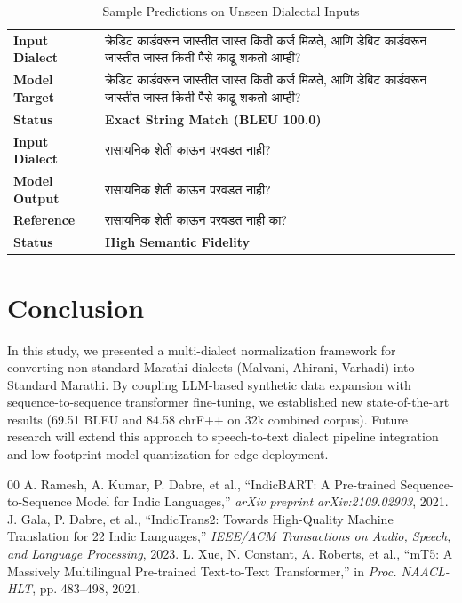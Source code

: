 \documentclass[journal,twocolumn]{IEEEtran}
\begin{document}
\begin{table}[h]
\caption{Sample Predictions on Unseen Dialectal Inputs}
\label{tab:qualitative}
\centering
\begin{tabularx}{\columnwidth}{l X}
\toprule
\textbf{Input Dialect} & क्रेडिट कार्डवरून जास्तीत जास्त किती कर्ज मिळते, आणि डेबिट कार्डवरून जास्तीत जास्त किती पैसे काढू शकतो आम्ही? \\
\textbf{Model Target} & क्रेडिट कार्डवरून जास्तीत जास्त किती कर्ज मिळते, आणि डेबिट कार्डवरून जास्तीत जास्त किती पैसे काढू शकतो आम्ही? \\
\textbf{Status} & \textbf{Exact String Match (BLEU 100.0)} \\
\midrule
\textbf{Input Dialect} & रासायनिक शेती काऊन परवडत नाही? \\
\textbf{Model Output} & रासायनिक शेती काऊन परवडत नाही? \\
\textbf{Reference} & रासायनिक शेती काऊन परवडत नाही का? \\
\textbf{Status} & \textbf{High Semantic Fidelity} \\
\bottomrule
\end{tabularx}
\end{table}

\section{Conclusion}
In this study, we presented a multi-dialect normalization framework for converting non-standard Marathi dialects (Malvani, Ahirani, Varhadi) into Standard Marathi. By coupling LLM-based synthetic data expansion with sequence-to-sequence transformer fine-tuning, we established new state-of-the-art results (69.51 BLEU and 84.58 chrF++ on 32k combined corpus). Future research will extend this approach to speech-to-text dialect pipeline integration and low-footprint model quantization for edge deployment.

\begin{thebibliography}{00}
 A. Ramesh, A. Kumar, P. Dabre, et al., ``IndicBART: A Pre-trained Sequence-to-Sequence Model for Indic Languages,'' \emph{arXiv preprint arXiv:2109.02903}, 2021.
 J. Gala, P. Dabre, et al., ``IndicTrans2: Towards High-Quality Machine Translation for 22 Indic Languages,'' \emph{IEEE/ACM Transactions on Audio, Speech, and Language Processing}, 2023.
 L. Xue, N. Constant, A. Roberts, et al., ``mT5: A Massively Multilingual Pre-trained Text-to-Text Transformer,'' in \emph{Proc. NAACL-HLT}, pp. 483--498, 2021.
\end{thebibliography}
\end{document}
